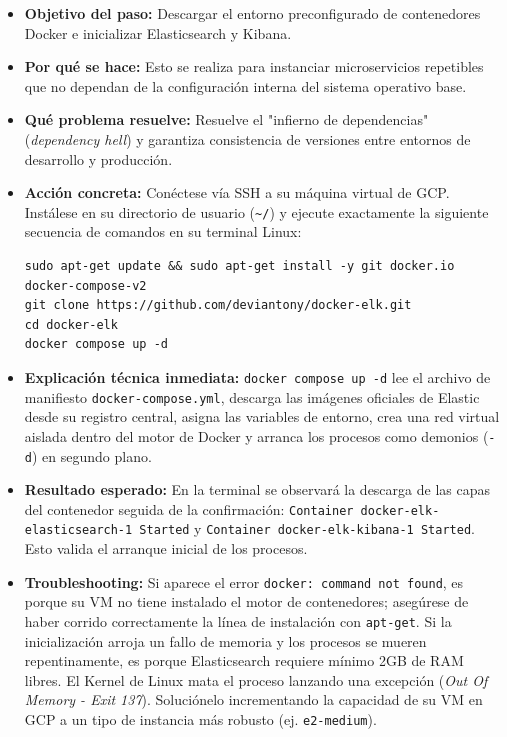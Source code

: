 \documentclass[
  coursetitle={Cómputo Nube y Tecnologías Emergentes},
  coursehours={96},
  coursedate={Verano 2026},
  doctype={Guía de Laboratorio Práctico},
  otherlangs={english,french},
  authorname={Lázaro},
  authorsurname={Bustio-Martínez},
  authortitle={PhD},
  role={Profesor Investigador},
  email={lbustio@inaoe.mx},
  phone={5559504000},
  ext={7459},
  institution={Instituto Nacional de Astrofísica, Óptica y Electrónica (INAOE)},
  department={Maestría en Ciencias en Tecnologías de Seguridad},
  address={Luis Enrique Erro 1, Sta. Ma. Tonantzintla, San Andrés Cholula, CP 72840, Puebla, México},
  margin={0.5in}
]{../../lbustio_lecture_notes}
\begin{document}
\begin{itemize}
    \item \textbf{Objetivo del paso:} Descargar el entorno preconfigurado de contenedores Docker e inicializar Elasticsearch y Kibana.
    \item \textbf{Por qué se hace:} Esto se realiza para instanciar microservicios repetibles que no dependan de la configuración interna del sistema operativo base.
    \item \textbf{Qué problema resuelve:} Resuelve el "infierno de dependencias" (\textit{dependency hell}) y garantiza consistencia de versiones entre entornos de desarrollo y producción.
    \item \textbf{Acción concreta:} Conéctese vía SSH a su máquina virtual de GCP. Instálese en su directorio de usuario (\texttt{\textasciitilde/}) y ejecute exactamente la siguiente secuencia de comandos en su terminal Linux:
    
\begin{verbatim}
sudo apt-get update && sudo apt-get install -y git docker.io docker-compose-v2
git clone https://github.com/deviantony/docker-elk.git
cd docker-elk
docker compose up -d
\end{verbatim}

    \item \textbf{Explicación técnica inmediata:} \texttt{docker compose up -d} lee el archivo de manifiesto \texttt{docker-compose.yml}, descarga las imágenes oficiales de Elastic desde su registro central, asigna las variables de entorno, crea una red virtual aislada dentro del motor de Docker y arranca los procesos como demonios (\texttt{-d}) en segundo plano.
    
    \item \textbf{Resultado esperado:} En la terminal se observará la descarga de las capas del contenedor seguida de la confirmación: \texttt{Container docker-elk-elasticsearch-1 Started} y \texttt{Container docker-elk-kibana-1 Started}. Esto valida el arranque inicial de los procesos.
    
    \item \textbf{Troubleshooting:} Si aparece el error \texttt{docker: command not found}, es porque su VM no tiene instalado el motor de contenedores; asegúrese de haber corrido correctamente la línea de instalación con \texttt{apt-get}. Si la inicialización arroja un fallo de memoria y los procesos se mueren repentinamente, es porque Elasticsearch requiere mínimo 2GB de RAM libres. El Kernel de Linux mata el proceso lanzando una excepción (\textit{Out Of Memory - Exit 137}). Soluciónelo incrementando la capacidad de su VM en GCP a un tipo de instancia más robusto (ej. \texttt{e2-medium}).
\end{itemize}
\end{document}
